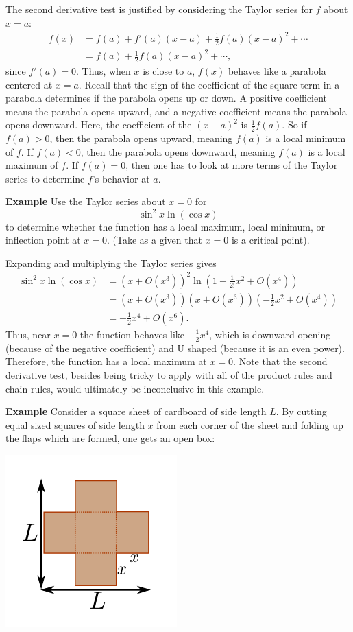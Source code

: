 \documentclass[twoside,openright,titlepage,a4paper]{book}
\begin{document}
\begin{sloppypar}
\begin{examplebox}
The second derivative test is justified by considering the Taylor series for $f$ about $x=a$:
\begin{align*}
f(x) &= f(a) + f'(a)(x-a) + \frac{1}{2}f(a)(x-a)^2+\dotsb \\
&= f(a) + \frac{1}{2}f(a)(x-a)^2 + \dotsb,
\end{align*}
since $f'(a)=0$. Thus, when $x$ is close to $a$, $f(x)$ behaves like a parabola centered at $x=a$. Recall that the sign of the coefficient of the square term in a parabola determines if the parabola opens up or down. A positive coefficient means the parabola opens upward, and a negative coefficient means the parabola opens downward.
Here, the coefficient of the $(x-a)^2$ is $\frac{1}{2}f(a)$. So if $f(a)>0$, then the parabola opens upward, meaning $f(a)$ is a local minimum of $f$. If $f(a)<0$, then the parabola opens downward, meaning $f(a)$ is a local maximum of $f$. If $f(a)=0$, then one has to look at more terms of the Taylor series to determine $f$'s behavior at $a$.	
\end{examplebox}	
\bigbreak
\textbf{Example} Use the Taylor series about $x=0$ for \[ \sin^2x \ln(\cos x) \] to determine whether the function has a local maximum, local minimum, or inflection point at $x=0$. (Take as a given that $x=0$ is a critical point).
\begin{examplebox}
Expanding and multiplying the Taylor series gives
\begin{align*}
\sin^2 x \ln (\cos x) &= \left( x+ O(x^3) \right)^2 \ln \left( 1 - \frac{1}{2!}x^2 + O(x^4) \right) \\
&= (x + O(x^3))(x+ O(x^3)) \left(-\frac{1}{2}x^2 + O(x^4)\right) \\
&= -\frac{1}{2}x^4 + O(x^6). 
\end{align*}
Thus, near $x=0$ the function behaves like $-\frac{1}{2}x^4$, which is downward opening (because of the negative coefficient) and U shaped (because it is an even power). Therefore, the function has a local maximum at $x=0$.
Note that the second derivative test, besides being tricky to apply with all of the product rules and chain rules, would ultimately be inconclusive in this example.	
\end{examplebox}
\bigbreak
\textbf{Example} Consider a square sheet of cardboard of side length $L$. By cutting equal sized squares of side length $x$ from each corner of the sheet and folding up the flaps which are formed, one gets an open box:
\begin{center}\includegraphics[scale=0.6]{BoxMax}\end{center}

\end{sloppypar}
\end{document}

